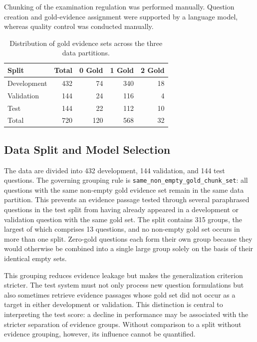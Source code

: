 \documentclass[11pt]{article}
\begin{document}
Chunking of the examination regulation was performed manually. Question creation and gold-evidence assignment were supported by a language model, whereas quality control was conducted manually.

\begin{table}[t]
\centering
\small
\begin{tabular}{lrrrr}
\toprule
\textbf{Split} & \textbf{Total} & \textbf{0 Gold} & \textbf{1 Gold} & \textbf{2 Gold} \\
\midrule
Development & 432 & 74 & 340 & 18 \\
Validation & 144 & 24 & 116 & 4 \\
Test         & 144 & 22 & 112 & 10 \\
\midrule
Total       & 720 & 120 & 568 & 32 \\
\bottomrule
\end{tabular}
\caption{Distribution of gold evidence sets across the three data partitions.}
\label{tab:gold-distribution}
\end{table}

\subsection{Data Split and Model Selection}

The data are divided into 432 development, 144 validation, and 144 test questions. The governing grouping rule is \texttt{same\_non\_empty\_gold\_chunk\_set}: all questions with the same non-empty gold evidence set remain in the same data partition. This prevents an evidence passage tested through several paraphrased questions in the test split from having already appeared in a development or validation question with the same gold set. The split contains 315 groups, the largest of which comprises 13 questions, and no non-empty gold set occurs in more than one split. Zero-gold questions each form their own group because they would otherwise be combined into a single large group solely on the basis of their identical empty sets.

This grouping reduces evidence leakage but makes the generalization criterion stricter. The test system must not only process new question formulations but also sometimes retrieve evidence passages whose gold set did not occur as a target in either development or validation. This distinction is central to interpreting the test score: a decline in performance may be associated with the stricter separation of evidence groups. Without comparison to a split without evidence grouping, however, its influence cannot be quantified.
\end{document}

